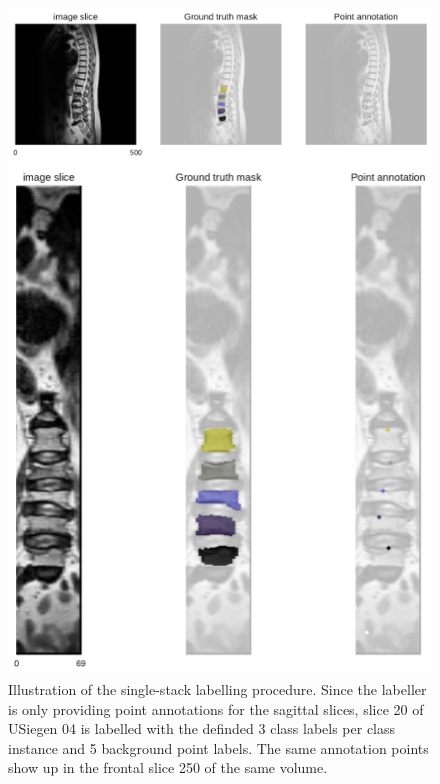 \begin{figure}
    \centering
    \centering
    \begin{minipage}{.75\textwidth}
        \includegraphics[width=.99\textwidth]{images/USiegen004_s20_points.pdf}
    \end{minipage} 
    \vspace{1 mm}
    \begin{minipage}{.60\textwidth}
        \includegraphics[width=.99\textwidth]{images/USiegen004_s250_front_points.pdf}
    \end{minipage} 
    \vspace{2 mm}
    \caption{Illustration of the single-stack labelling procedure.
    Since the labeller is only providing point annotations for the sagittal slices, slice 20 of USiegen 04 is labelled with the definded 3 class labels per class instance and 5 background point labels.
    The same annotation points show up in the frontal slice 250 of the same volume. 
    \protect\label{fig:inferepoints_2}}
\end{figure}



